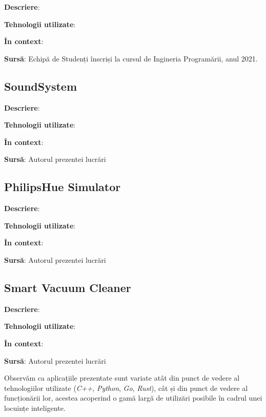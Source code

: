 \textbf{Descriere}: 

\textbf{Tehnologii utilizate}: 

\textbf{În context}: 

\textbf{Sursă}: Echipă de Studenți înscriși la cursul de Ingineria Programării, anul 2021.

\subsection*{SoundSystem}

\textbf{Descriere}: 

\textbf{Tehnologii utilizate}: 

\textbf{În context}: 

\textbf{Sursă}: Autorul prezentei lucrări


\subsection*{PhilipsHue Simulator}

\textbf{Descriere}: 

\textbf{Tehnologii utilizate}: 

\textbf{În context}: 

\textbf{Sursă}: Autorul prezentei lucrări

\subsection*{Smart Vacuum Cleaner}

\textbf{Descriere}: 

\textbf{Tehnologii utilizate}:

\textbf{În context}: 

\textbf{Sursă}: Autorul prezentei lucrări

Observăm ca aplicațiile prezentate sunt variate atât din punct de vedere al tehnologiilor utilizate (\textit{C++}, \textit{Python}, \textit{Go}, \textit{Rust}), cât și din punct de vedere al funcționării lor, acestea acoperind o gamă largă de utilizări posibile în cadrul unei locuințe inteligente. 

